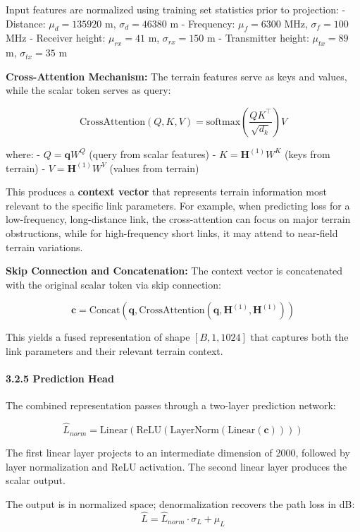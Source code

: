 \documentclass[
]{article}
\begin{document}
Input features are normalized using training set statistics prior to
projection: - Distance: \(\mu_d = 135920\) m, \(\sigma_d = 46380\) m -
Frequency: \(\mu_f = 6300\) MHz, \(\sigma_f = 100\) MHz - Receiver
height: \(\mu_{rx} = 41\) m, \(\sigma_{rx} = 150\) m - Transmitter
height: \(\mu_{tx} = 89\) m, \(\sigma_{tx} = 35\) m

\textbf{Cross-Attention Mechanism:} The terrain features serve as keys
and values, while the scalar token serves as query:

\[\text{CrossAttention}(Q, K, V) = \text{softmax}\left(\frac{QK^\top}{\sqrt{d_k}}\right)V\]

where: - \(Q = \mathbf{q}W^Q\) (query from scalar features) -
\(K = \mathbf{H}^{(1)}W^K\) (keys from terrain) -
\(V = \mathbf{H}^{(1)}W^V\) (values from terrain)

This produces a \textbf{context vector} that represents terrain
information most relevant to the specific link parameters. For example,
when predicting loss for a low-frequency, long-distance link, the
cross-attention can focus on major terrain obstructions, while for
high-frequency short links, it may attend to near-field terrain
variations.

\textbf{Skip Connection and Concatenation:} The context vector is
concatenated with the original scalar token via skip connection:

\[\mathbf{c} = \text{Concat}(\mathbf{q}, \text{CrossAttention}(\mathbf{q}, \mathbf{H}^{(1)}, \mathbf{H}^{(1)}))\]

This yields a fused representation of shape \([B, 1, 1024]\) that
captures both the link parameters and their relevant terrain context.

\paragraph{3.2.5 Prediction Head}\label{prediction-head}

The combined representation passes through a two-layer prediction
network:

\[\hat{L}_{norm} = \text{Linear}(\text{ReLU}(\text{LayerNorm}(\text{Linear}(\mathbf{c}))))\]

The first linear layer projects to an intermediate dimension of 2000,
followed by layer normalization and ReLU activation. The second linear
layer produces the scalar output.

The output is in normalized space; denormalization recovers the path
loss in dB: \[\hat{L} = \hat{L}_{norm} \cdot \sigma_L + \mu_L\]
\end{document}
